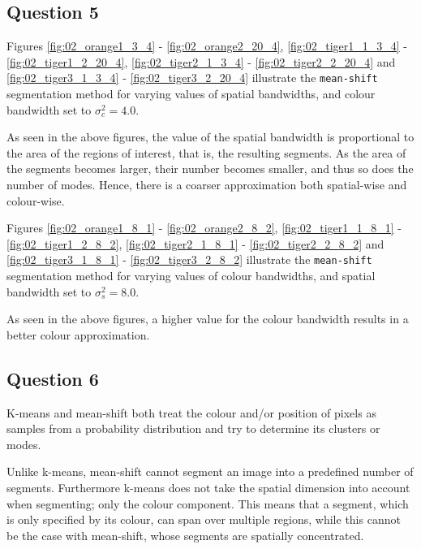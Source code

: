 \subsection{Question 5}

Figures \ref{fig:02_orange1_3_4} - \ref{fig:02_orange2_20_4},
\ref{fig:02_tiger1_1_3_4} - \ref{fig:02_tiger1_2_20_4},
\ref{fig:02_tiger2_1_3_4} - \ref{fig:02_tiger2_2_20_4} and
\ref{fig:02_tiger3_1_3_4} - \ref{fig:02_tiger3_2_20_4} illustrate
the \texttt{mean-shift} segmentation method for varying values of spatial
bandwidths, and colour bandwidth set to $\sigma_c^2 = 4.0$.

As seen in the above figures, the value of the spatial bandwidth is proportional
to the area of the regions of interest, that is, the resulting segments. As
the area of the segments becomes larger, their number becomes smaller, and thus
so does the number of modes. Hence, there is a coarser approximation both
spatial-wise and colour-wise.

Figures \ref{fig:02_orange1_8_1} - \ref{fig:02_orange2_8_2},
\ref{fig:02_tiger1_1_8_1} - \ref{fig:02_tiger1_2_8_2},
\ref{fig:02_tiger2_1_8_1} - \ref{fig:02_tiger2_2_8_2} and
\ref{fig:02_tiger3_1_8_1} - \ref{fig:02_tiger3_2_8_2} illustrate
the \texttt{mean-shift} segmentation method for varying values of colour
bandwidths, and spatial bandwidth set to $\sigma_s^2 = 8.0$.

As seen in the above figures, a higher value for the colour bandwidth results
in a better colour approximation.


\subsection{Question 6}

K-means and mean-shift both treat the colour and/or position of pixels as
samples from a probability distribution and try to determine its clusters or
modes.

Unlike k-means, mean-shift cannot segment an image into a predefined number of
segments. Furthermore k-means does not take the spatial dimension into account
when segmenting; only the colour component. This means that a segment, which is
only specified by its colour, can span over multiple regions, while this
cannot be the case with mean-shift, whose segments are spatially concentrated.
